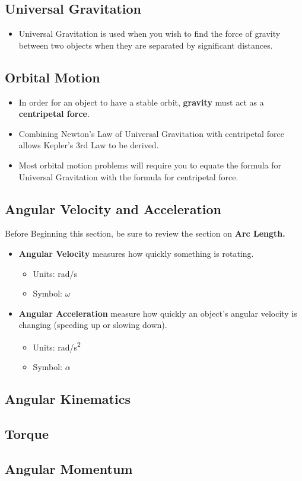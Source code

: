 \documentclass[letterpaper, 12pt]{article}
\begin{document}
\subsection*{Universal Gravitation}
	\begin{itemize}
		\item Universal Gravitation is used when you wish to find the force of gravity between two objects when they are separated by significant distances.  
	\end{itemize}

\subsection*{Orbital Motion}
	\begin{itemize}
		\item In order for an object to have a stable orbit, \textbf{gravity} must act as a \textbf{centripetal force}. 
		\item Combining Newton's Law of Universal Gravitation with centripetal force allows Kepler's 3rd Law to be derived.  
		\item Most orbital motion problems will require you to equate the formula for Universal Gravitation with the formula for centripetal force. 
		
		
	\end{itemize}

\subsection*{Angular Velocity and Acceleration}
Before Beginning this section, be sure to review the section on \textbf{Arc Length.} 

\begin{itemize}
	\item \textbf{Angular Velocity} measures how quickly something is rotating.  
	\begin{itemize}
		\item Units: rad/s
		\item Symbol: $\omega$
	\end{itemize}
	\item \textbf{Angular Acceleration} measure how quickly an object's angular velocity is changing (speeding up or slowing down).  
	\begin{itemize}
		\item Units: rad/s\textsuperscript{2}
		\item Symbol: $\alpha$
	\end{itemize}

\end{itemize}

\subsection*{Angular Kinematics}

\subsection*{Torque}

\subsection*{Angular Momentum}

 
\end{document}

